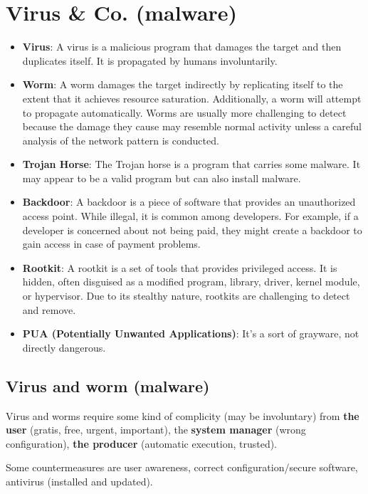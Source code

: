 \section{Virus \& Co. (malware)}
\begin{itemize}
  \item \textbf{Virus}:
        A virus is a malicious program that damages the target and then duplicates itself. It is propagated by humans involuntarily.
  \item \textbf{Worm}:
        A worm damages the target indirectly by replicating itself to the extent that it achieves resource saturation. Additionally, a worm will attempt to propagate automatically. Worms are usually more challenging to detect because the damage they cause may resemble normal activity unless a careful analysis of the network pattern is conducted.
  \item \textbf{Trojan Horse}:
        The Trojan horse is a program that carries some malware. It may appear to be a valid program but can also install malware.
  \item \textbf{Backdoor}:
        A backdoor is a piece of software that provides an unauthorized access point. While illegal, it is common among developers. For example, if a developer is concerned about not being paid, they might create a backdoor to gain access in case of payment problems.
  \item \textbf{Rootkit}:
        A rootkit is a set of tools that provides privileged access. It is hidden, often disguised as a modified program, library, driver, kernel module, or hypervisor. Due to its stealthy nature, rootkits are challenging to detect and remove.
  \item \textbf{PUA (Potentially Unwanted Applications)}:
        It's a sort of grayware, not directly dangerous.
\end{itemize}


\subsection*{Virus and worm (malware)}
Virus and worms require some kind of complicity (may be involuntary) from \textbf{the user} (gratis, free, urgent,
important), the \textbf{system manager} (wrong configuration), \textbf{the producer} (automatic execution, trusted).

Some countermeasures are user awareness, correct configuration/secure software, antivirus (installed and updated).



